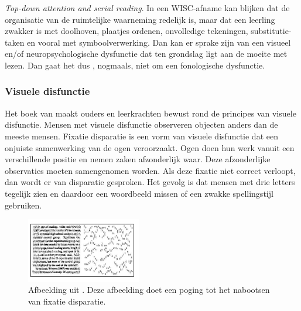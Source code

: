 

\textit{Top-down attention and serial reading}. In een WISC-afname kan blijken dat de organisatie van de ruimtelijke waarneming redelijk is, maar dat een leerling zwakker is met doolhoven, plaatjes ordenen, onvolledige tekeningen, substitutie-taken en vooral met symboolverwerking. Dan kan er sprake zijn van een visueel en/of neuropsychologische dysfunctie dat ten grondslag ligt aan de moeite met lezen. Dan gaat het dus , nogmaals, niet om een fonologische dysfunctie.

\subsubsection{Visuele disfunctie}

Het boek van \textcite{Bezem2016} maakt ouders en leerkrachten bewust rond de principes van visuele disfunctie. Mensen met visuele disfunctie observeren objecten anders dan de meeste mensen. Fixatie disparatie is een vorm van visuele disfunctie dat een onjuiste samenwerking van de ogen veroorzaakt. Ogen doen hun werk vanuit een verschillende positie en nemen zaken afzonderlijk waar. Deze afzonderlijke observaties moeten samengenomen worden. Als deze fixatie niet correct verloopt, dan wordt er van disparatie gesproken. Het gevolg is dat mensen met drie letters tegelijk zien en daardoor een woordbeeld missen of een zwakke spellingstijl gebruiken.

\begin{figure}[H]
	\begin{center}
		\includegraphics[width=5cm]{img/visuele-disfunctie.png}
	\end{center}
	\caption{Afbeelding uit \textcite{Bezem2016}. Deze afbeelding doet een poging tot het nabootsen van fixatie disparatie. }
\end{figure}

